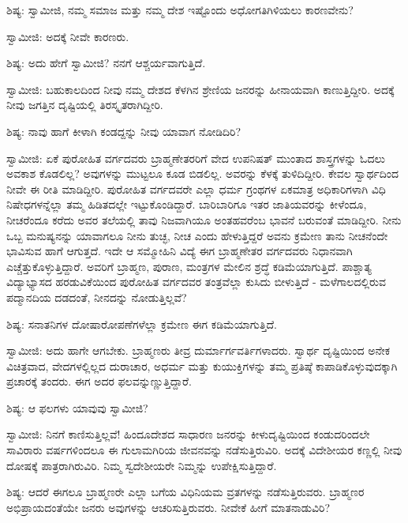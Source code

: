 ಶಿಷ್ಯ: ಸ್ವಾಮೀಜಿ, ನಮ್ಮ ಸಮಾಜ ಮತ್ತು ನಮ್ಮ ದೇಶ ಇಷ್ಟೊಂದು ಅಧೋಗತಿಗಿಳಿಯಲು ಕಾರಣವೇನು?

ಸ್ವಾಮೀಜಿ: ಅದಕ್ಕೆ ನೀವೇ ಕಾರಣರು.

ಶಿಷ್ಯ: ಅದು ಹೇಗೆ ಸ್ವಾಮೀಜಿ? ನನಗೆ ಆಶ್ಚರ್ಯವಾಗುತ್ತಿದೆ.

ಸ್ವಾಮೀಜಿ: ಬಹುಕಾಲದಿಂದ ನೀವು ನಮ್ಮ ದೇಶದ ಕೆಳಗಿನ ಶ್ರೇಣಿಯ ಜನರನ್ನು ಹೀನಾಯವಾಗಿ ಕಾಣುತ್ತಿದ್ದೀರಿ. ಅದಕ್ಕೆ ನೀವು ಜಗತ್ತಿನ ದೃಷ್ಟಿಯಲ್ಲಿ ತಿರಸ್ಕೃತರಾಗಿದ್ದೀರಿ.

ಶಿಷ್ಯ: ನಾವು ಹಾಗೆ ಕೀಳಾಗಿ ಕಂಡದ್ದನ್ನು ನೀವು ಯಾವಾಗ ನೋಡಿದಿರಿ?

ಸ್ವಾಮೀಜಿ: ಏಕೆ ಪುರೋಹಿತ ವರ್ಗದವರು ಬ್ರಾಹ್ಮಣೇತರರಿಗೆ ವೇದ ಉಪನಿಷತ್ ಮುಂತಾದ ಶಾಸ್ತ್ರಗಳನ್ನು ಓದಲು ಅವಕಾಶ ಕೊಡಲಿಲ್ಲ? ಅವುಗಳನ್ನು ಮುಟ್ಟಲೂ ಕೂಡ ಬಿಡಲಿಲ್ಲ. ಅವರನ್ನು ಕೆಳಕ್ಕೆ ತುಳಿದಿದ್ದೀರಿ. ಕೇವಲ ಸ್ವಾರ್ಥದಿಂದ ನೀವೇ ಈ ರೀತಿ ಮಾಡಿದ್ದೀರಿ. ಪುರೋಹಿತ ವರ್ಗದವರೇ ಎಲ್ಲಾ ಧರ್ಮ ಗ್ರಂಥಗಳ ಏಕಮಾತ್ರ ಅಧಿಕಾರಿಗಳಾಗಿ ವಿಧಿ ನಿಷೇಧಗಳನ್ನೆಲ್ಲಾ ತಮ್ಮ ಹಿಡಿತದಲ್ಲೇ ಇಟ್ಟುಕೊಂಡಿದ್ದಾರೆ. ಬಾರಿಬಾರಿಗೂ ಇತರ ಜಾತಿಯವರನ್ನು ಕೀಳೆಂದೂ, ನೀಚರೆಂದೂ ಕರೆದು ಅವರ ತಲೆಯಲ್ಲಿ ತಾವು ನಿಜವಾಗಿಯೂ ಅಂತಹವರೆಂಬ ಭಾವನೆ ಬರುವಂತೆ ಮಾಡಿದ್ದೀರಿ. ನೀನು ಒಬ್ಬ ಮನುಷ್ಯನನ್ನು ಯಾವಾಗಲೂ ನೀನು ತುಚ್ಛ, ನೀಚ ಎಂದು ಹೇಳುತ್ತಿದ್ದರೆ ಅವನು ಕ್ರಮೇಣ ತಾನು ನೀಚನೆಂದೇ ಭಾವಿಸುವ ಹಾಗೆ ಆಗುತ್ತದೆ. ಇದೇ ಆ ಸಮ್ಮೋಹಿನಿ ವಿದ್ಯೆ  ಈಗ ಬ್ರಾಹ್ಮಣೇತರ ವರ್ಗದವರು ನಿಧಾನವಾಗಿ ಎಚ್ಚೆತ್ತುಕೊಳ್ಳುತ್ತಿದ್ದಾರೆ. ಅವರಿಗೆ ಬ್ರಾಹ್ಮಣ, ಪುರಾಣ, ಮಂತ್ರಗಳ ಮೇಲಿನ ಶ್ರದ್ಧೆ ಕಡಿಮೆಯಾಗುತ್ತಿದೆ. ಪಾಶ್ಚಾತ್ಯ ವಿದ್ಯಾಭ್ಯಾಸದ ಹರಡುವಿಕೆಯಿಂದ ಪುರೋಹಿತ ವರ್ಗದವರ ತಂತ್ರವೆಲ್ಲಾ ಕುಸಿದು ಬೀಳುತ್ತಿದೆ - ಮಳೆಗಾಲದಲ್ಲಿರುವ ಪದ್ಮಾನದಿಯ ದಡದಂತೆ, ನೀನದನ್ನು ನೋಡುತ್ತಿಲ್ಲವೆ?

ಶಿಷ್ಯ: ಸನಾತನಿಗಳ ದೋಷಾರೋಪಣೆಗಳೆಲ್ಲಾ ಕ್ರಮೇಣ ಈಗ ಕಡಿಮೆಯಾಗುತ್ತಿದೆ.

ಸ್ವಾಮೀಜಿ: ಅದು ಹಾಗೇ ಆಗಬೇಕು. ಬ್ರಾಹ್ಮಣರು ತೀವ್ರ ದುರ್ಮಾರ್ಗವರ್ತಿಗಳಾದರು. ಸ್ವಾರ್ಥ ದೃಷ್ಟಿಯಿಂದ ಅನೇಕ ವಿಚಿತ್ರವಾದ, ವೇದಗಳಲ್ಲಿಲ್ಲದ ದುರಾಚಾರ, ಅಧರ್ಮ ಮತ್ತು ಕುಯುಕ್ತಿಗಳನ್ನು ತಮ್ಮ ಪ್ರತಿಷ್ಠೆ ಕಾಪಾಡಿಕೊಳ್ಳುವುದಕ್ಕಾಗಿ ಪ್ರಚಾರಕ್ಕೆ ತಂದರು. ಈಗ ಅದರ ಫಲವನ್ನುಣ್ಣುತ್ತಿದ್ದಾರೆ.

ಶಿಷ್ಯ: ಆ ಫಲಗಳು ಯಾವುವು ಸ್ವಾಮೀಜಿ?

ಸ್ವಾಮೀಜಿ: ನಿನಗೆ ಕಾಣಿಸುತ್ತಿಲ್ಲವೆ! ಹಿಂದೂದೇಶದ ಸಾಧಾರಣ ಜನರನ್ನು ಕೀಳುದೃಷ್ಟಿಯಿಂದ ಕಂಡುದರಿಂದಲೇ ಸಾವಿರಾರು ವರ್ಷಗಳಿಂದಲೂ ಈ ಗುಲಾಮಗಿರಿಯ ಜೀವನವನ್ನು ನಡೆಸುತ್ತಿರುವಿರಿ. ಅದಕ್ಕೆ ವಿದೇಶೀಯರ ಕಣ್ಣಲ್ಲಿ ನೀವು ದೋಷಕ್ಕೆ ಪಾತ್ರರಾಗಿರುವಿರಿ. ನಿಮ್ಮ ಸ್ವದೇಶೀಯರೇ ನಿಮ್ಮನ್ನು ಉಪೇಕ್ಷಿಸುತ್ತಿದ್ದಾರೆ.

ಶಿಷ್ಯ: ಆದರೆ ಈಗಲೂ ಬ್ರಾಹ್ಮಣರೇ ಎಲ್ಲಾ ಬಗೆಯ ವಿಧಿನಿಯಮ ವ್ರತಗಳನ್ನು ನಡೆಸುತ್ತಿರುವರು. ಬ್ರಾಹ್ಮಣರ ಅಭಿಪ್ರಾಯದಂತೆಯೇ ಜನರು ಅವುಗಳನ್ನು ಆಚರಿಸುತ್ತಿರುವರು. ನೀವೇಕೆ ಹೀಗೆ ಮಾತನಾಡುವಿರಿ?

